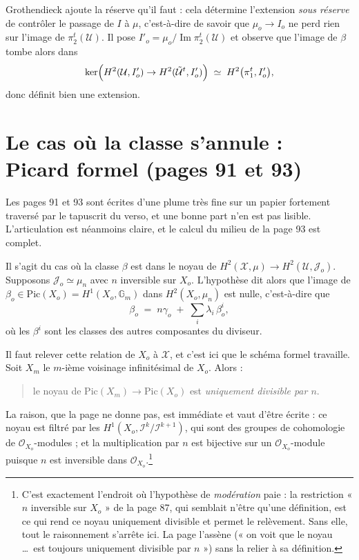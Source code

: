 \documentclass[11pt,a4paper]{article}
\begin{document}
Grothendieck ajoute la réserve qu'il faut : cela détermine l'extension
\emph{sous réserve} de contrôler le passage de $I$ à $\mu$, c'est-à-dire de
savoir que $\mu_{o} \to I_{o}$ ne perd rien sur l'image de
$\pi_{2}^{t}(\mathcal{U})$. Il pose $I'_{o} = \mu_{o}/\operatorname{Im}
\pi_{2}^{t}(\mathcal{U})$ et observe que l'image de $\beta$ tombe alors dans
\[
  \ker\Bigl(H^{2}(\mathcal{U}, I'_{o}) \to
  H^{2}(\tilde{\mathcal{U}}^{t}, I'_{o})\Bigr) \;\simeq\;
  H^{2}\bigl(\pi_{1}^{t}, I'_{o}\bigr) ,
\]
donc définit bien une extension.

\section*{Le cas où la classe s'annule : Picard formel (pages 91 et 93)}

Les pages 91 et 93 sont écrites d'une plume très fine sur un papier fortement
traversé par le tapuscrit du verso, et une bonne part n'en est pas lisible.
L'articulation est néanmoins claire, et le calcul du milieu de la page 93 est
complet.

Il s'agit du cas où la classe $\beta$ est dans le noyau de
$H^{2}(\mathcal{X}, \mu) \to H^{2}(\mathcal{U}, \mathcal{J}_{o})$. Supposons
$\mathcal{J}_{o} \simeq \mu_{n}$ avec $n$ inversible sur $X_{o}$. L'hypothèse
dit alors que l'image de
$\beta_{o} \in \mathrm{Pic}(X_{o}) = H^{1}(X_{o}, \mathbb{G}_{m})$ dans
$H^{2}(X_{o}, \mu_{n})$ est nulle, c'est-à-dire que
\[
  \beta_{o} \;=\; n\gamma_{o} \;+\; \sum_{i} \lambda_{i}\,\beta_{o}^{i} ,
\]
où les $\beta^{i}$ sont les classes des autres composantes du diviseur.

Il faut relever cette relation de $X_{o}$ à $\mathcal{X}$, et c'est ici que le
schéma formel travaille. Soit $X_{m}$ le $m$-ième voisinage infinitésimal de
$X_{o}$. Alors :

\begin{quote}
le noyau de $\mathrm{Pic}(X_{m}) \to \mathrm{Pic}(X_{o})$ est \emph{uniquement
divisible par $n$}.
\end{quote}

La raison, que la page ne donne pas, est immédiate et vaut d'être écrite : ce
noyau est filtré par les $H^{1}(X_{o}, \mathcal{I}^{k}/\mathcal{I}^{k+1})$, qui
sont des groupes de cohomologie de $\mathcal{O}_{X_{o}}$-modules ; et la
multiplication par $n$ est bijective sur un $\mathcal{O}_{X_{o}}$-module
puisque $n$ est inversible dans $\mathcal{O}_{X_{o}}$.\footnote{C'est
exactement l'endroit où l'hypothèse de \emph{modération} paie : la restriction
« $n$ inversible sur $X_{o}$ » de la page 87, qui semblait n'être qu'une
définition, est ce qui rend ce noyau uniquement divisible et permet le
relèvement. Sans elle, tout le raisonnement s'arrête ici. La page l'assène
(« on voit que le noyau \dots\ est toujours uniquement divisible par $n$ »)
sans la relier à sa définition.}
\end{document}
